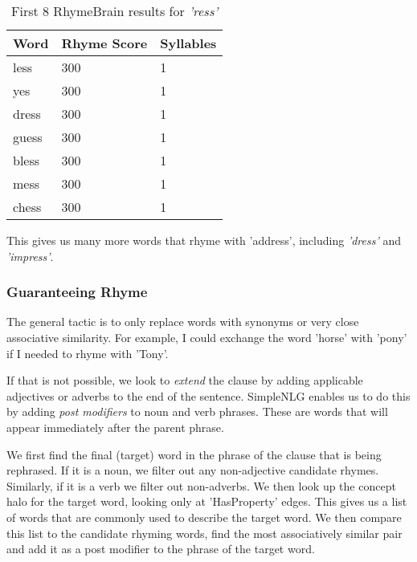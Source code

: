 \begin{table}
    \begin{tabular}{|l|l|l|}
    \hline
    Word  & Rhyme Score & Syllables \\ \hline
    less  & 300         & 1         \\ \hline
    yes   & 300         & 1         \\ \hline
    dress & 300         & 1         \\ \hline
    guess & 300         & 1         \\ \hline
    bless & 300         & 1         \\ \hline
    mess  & 300         & 1         \\ \hline
    chess & 300         & 1         \\ \hline
    \end{tabular}
\caption{First 8 RhymeBrain results for \textit{'ress'}}
\label{tab:ress-rb}
\end{table}

This gives us many more words that rhyme with 'address', including \textit{'dress'} and \textit{'impress'}.

\subsubsection{Guaranteeing Rhyme}
\label{sec:guarantee-rhyme}

The general tactic is to only replace words with synonyms or very close associative similarity. For example, I could exchange the word 'horse' with 'pony' if I needed to rhyme with 'Tony'. 

If that is not possible, we look to \textit{extend} the clause by adding applicable adjectives or adverbs to the end of the sentence. SimpleNLG enables us to do this by adding \textit{post modifiers} to noun and verb phrases. These are words that will appear immediately after the parent phrase.

We first find the final (target) word in the phrase of the clause that is being rephrased. If it is a noun, we filter out any non-adjective candidate rhymes. Similarly, if it is a verb we filter out non-adverbs. We then look up the concept halo for the target word, looking only at 'HasProperty' edges. This gives us a list of words that are commonly used to describe the target word. We then compare this list to the candidate rhyming words, find the most associatively similar pair and add it as a post modifier to the phrase of the target word.

